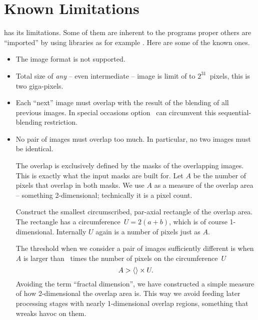 

\chapter[Known Limitations]{\label{sec:known-limitations}%
  Known Limitations}

\App{} has its limitations.  Some of them are inherent to the programs proper others are
``imported'' by using libraries as for example .  Here are
some of the known ones.

\begin{itemize}
\item
  The  image format is not supported.

\item
  Total size of \emph{any} -- even intermediate -- image is limit of to $2^{31}$~pixels, this is
  two giga-pixels.

\ifenblend
\item
  Each ``next'' image must overlap with the result of the blending of all previous images.  In
  special occasions option~ can circumvent this sequential-blending
  restriction.

\item
  No pair of images must overlap too much.  In particular, no two images must be identical.

  \begin{geeknote}
    The overlap is exclusively defined by the masks of the overlapping images.  This is exactly
    what the input masks are built for.  Let $A$ be the number of pixels that overlap in both
    masks.  We use $A$ as a measure of the overlap area -- something 2-dimensional; technically
    it is a pixel count.

    Construct the smallest circumscribed, par-axial rectangle of the overlap area.  The
    rectangle has a circumference~$U = 2 (a + b)$, which is of course 1-dimensional.  Internally
    $U$ again is a number of pixels just as $A$.

    The threshold when we consider a pair of images sufficiently different is when $A$ is larger
    than ~times the number of pixels on the circumference~$U$
    \[
    A > \val{val:overlap-check-threshold} \times U.
    \]
    Avoiding the term ``fractal dimension'', we have constructed a simple measure of how
    2-dimensional the overlap area is.  This way we avoid feeding later processing stages with
    nearly 1-dimensional overlap regions, something that wreaks havoc on them.
  \end{geeknote}


\end{itemize}
